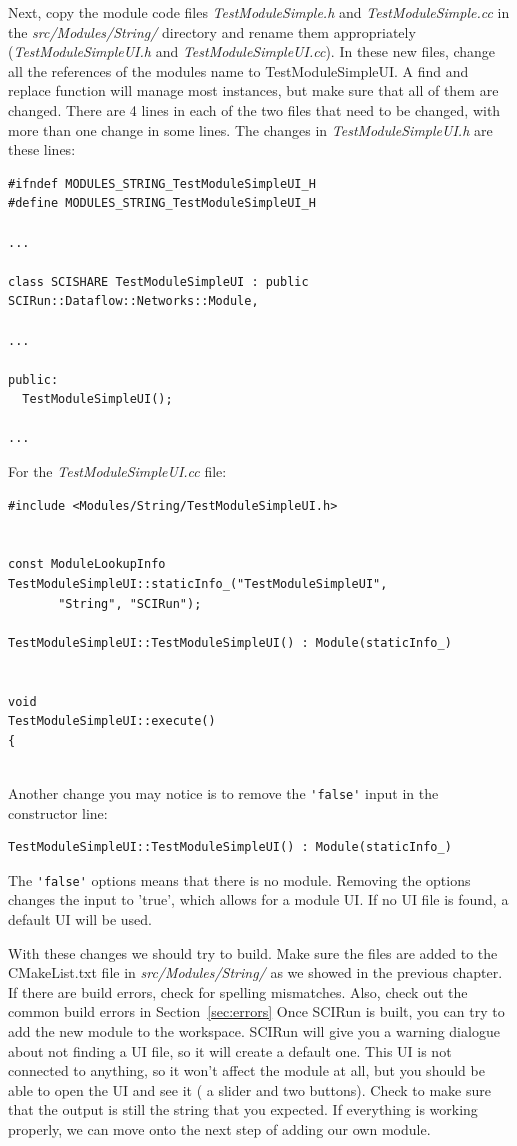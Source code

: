 \documentclass[fleqn,11pt,openany]{book}
\begin{document}
Next, copy the module code files \emph{TestModuleSimple.h} and \emph{TestModuleSimple.cc} in the \emph{src/Modules/String/} directory and rename them appropriately (\emph{TestModuleSimpleUI.h} and \emph{TestModuleSimpleUI.cc}).  
In these new files, change all the references of the modules name to TestModuleSimpleUI. 
A find and replace function will manage most instances, but make sure that all of them are changed. 
There are 4 lines in each of the two files that need to be changed, with more than one change in some lines.
The changes in \emph{TestModuleSimpleUI.h} are these lines:
\begin{verbatim}
#ifndef MODULES_STRING_TestModuleSimpleUI_H
#define MODULES_STRING_TestModuleSimpleUI_H

...

class SCISHARE TestModuleSimpleUI : public SCIRun::Dataflow::Networks::Module,

...

public:
  TestModuleSimpleUI();

...  

\end{verbatim}
For the \emph{TestModuleSimpleUI.cc} file:
\begin{verbatim}
#include <Modules/String/TestModuleSimpleUI.h>


const ModuleLookupInfo TestModuleSimpleUI::staticInfo_("TestModuleSimpleUI", 
       "String", "SCIRun");

TestModuleSimpleUI::TestModuleSimpleUI() : Module(staticInfo_)


void
TestModuleSimpleUI::execute()
{  
  
\end{verbatim}
Another change you may notice is to remove the \verb|'false'| input in the constructor line:
\begin{verbatim}
TestModuleSimpleUI::TestModuleSimpleUI() : Module(staticInfo_)
\end{verbatim}
The \verb|'false'| options means that there is no module.  
Removing the options changes the input to 'true', which allows for a module UI.  
If no UI file is found, a default UI will be used.  

With these changes we should try to build.  
Make sure the files are added to the CMakeList.txt file in \emph{src/Modules/String/} as we showed in the previous chapter.  
If there are build errors, check for spelling mismatches.
Also, check out the common build errors in Section~\ref{sec:errors}
Once SCIRun is built, you can try to add the new module to the workspace. 
SCIRun will give you a warning dialogue about not finding a UI file, so it will create a default one.
This UI is not connected to anything, so it won't affect the module at all, but you should be able to open the UI and see it ( a slider and two buttons).
Check to make sure that the output is still the string that you expected. 
If everything is working properly, we can move onto the next step of adding our own module. 
\end{document}
